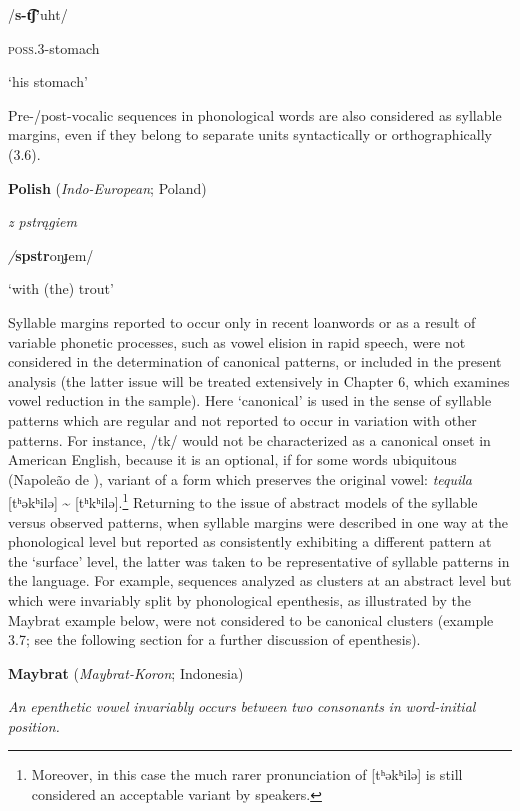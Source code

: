 /\textbf{s-t͡ʃ’}uht/

\textsc{poss.3}-stomach

‘his stomach’

\citep[24]{Polian2006}
\z

Pre-/post-vocalic sequences in phonological words are also considered as syllable margins, even if they belong to separate units syntactically or orthographically (3.6).

\ea\label{ex:(3.6)}
   \textbf{Polish} (\textit{Indo-European}; Poland)

\textit{z} \textit{pstrągiem}

\textit{/}\textbf{spstr}oŋɟem/

‘with (the) trout’

\citep[103]{Jassem2003}

\z

  Syllable margins reported to occur only in recent loanwords or as a result of variable phonetic processes, such as vowel elision in rapid speech, were not considered in the determination of canonical patterns, or included in the present analysis (the latter issue will be treated extensively in Chapter 6, which examines vowel reduction in the sample). Here ‘canonical’ is used in the sense of syllable patterns which are regular and not reported to occur in variation with other patterns. For instance, /tk/ would not be characterized as a canonical onset in American English, because it is an optional, if for some words ubiquitous (Napoleão de \citealt{Souza2019}), variant of a form which preserves the original vowel: \textit{tequila} [tʰəkʰilə] {\textasciitilde} [tʰkʰilə].\footnote{ \textrm{Moreover, in this case the much rarer pronunciation of [tʰəkʰilə] is still considered an acceptable variant by speakers.}} Returning to the issue of abstract models of the syllable versus observed patterns, when syllable margins were described in one way at the phonological level but reported as consistently exhibiting a different pattern at the ‘surface’ level, the latter was taken to be representative of syllable patterns in the language. For example, sequences analyzed as clusters at an abstract level but which were invariably split by phonological epenthesis, as illustrated by the Maybrat example below, were not considered to be canonical clusters (example 3.7; see the following section for a further discussion of epenthesis).

\ea\label{ex:(3.7)}
   \textbf{Maybrat} (\textit{Maybrat-Koron}; Indonesia)

\textit{An} \textit{epenthetic} \textit{vowel} \textit{invariably} \textit{occurs} \textit{between} \textit{two} \textit{consonants} \textit{in} \textit{word-initial} \textit{position.}

